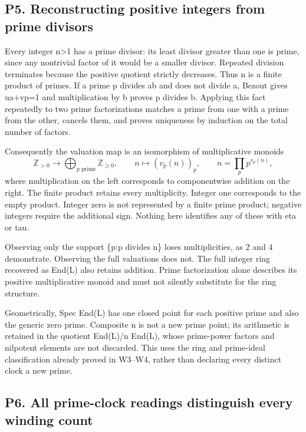 \documentclass[
  11pt,
]{article}
\begin{document}
\subsection{P5. Reconstructing positive integers from prime
divisors}\label{p5.-reconstructing-positive-integers-from-prime-divisors}

Every integer n\textgreater1 has a prime divisor: its least divisor
greater than one is prime, since any nontrivial factor of it would be a
smaller divisor. Repeated division terminates because the positive
quotient strictly decreases. Thus n is a finite product of primes. If a
prime p divides ab and does not divide a, Bezout gives ua+vp=1 and
multiplication by b proves p divides b. Applying this fact repeatedly to
two prime factorizations matches a prime from one with a prime from the
other, cancels them, and proves uniqueness by induction on the total
number of factors.

Consequently the valuation map is an isomorphism of multiplicative
monoids \[
\mathbb Z_{>0}\longrightarrow\bigoplus_{p\text{ prime}}\mathbb Z_{\ge0},
\qquad n\longmapsto(v_p(n))_p,
\qquad n=\prod_p p^{v_p(n)},
\] where multiplication on the left corresponds to componentwise
addition on the right. The finite product retains every multiplicity.
Integer one corresponds to the empty product. Integer zero is not
represented by a finite prime product; negative integers require the
additional sign. Nothing here identifies any of these with eta or tau.

Observing only the support \{p:p divides n\} loses multiplicities, as 2
and 4 demonstrate. Observing the full valuations does not. The full
integer ring recovered as End(L) also retains addition. Prime
factorization alone describes its positive multiplicative monoid and
must not silently substitute for the ring structure.

Geometrically, Spec End(L) has one closed point for each positive prime
and also the generic zero prime. Composite n is not a new prime point;
its arithmetic is retained in the quotient End(L)/n End(L), whose
prime-power factors and nilpotent elements are not discarded. This uses
the ring and prime-ideal classification already proved in W3--W4, rather
than declaring every distinct clock a new prime.

\subsection{P6. All prime-clock readings distinguish every winding
count}\label{p6.-all-prime-clock-readings-distinguish-every-winding-count}
\end{document}
